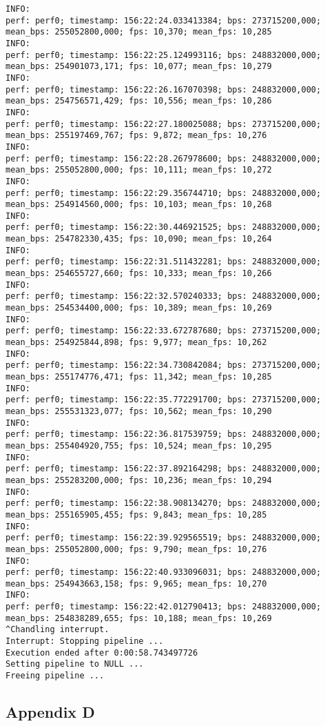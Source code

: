 \documentclass[12pt,oneside]{book}
\begin{document}
\begin{lstlisting}
INFO:
perf: perf0; timestamp: 156:22:24.033413384; bps: 273715200,000; mean_bps: 255052800,000; fps: 10,370; mean_fps: 10,285
INFO:
perf: perf0; timestamp: 156:22:25.124993116; bps: 248832000,000; mean_bps: 254901073,171; fps: 10,077; mean_fps: 10,279
INFO:
perf: perf0; timestamp: 156:22:26.167070398; bps: 248832000,000; mean_bps: 254756571,429; fps: 10,556; mean_fps: 10,286
INFO:
perf: perf0; timestamp: 156:22:27.180025088; bps: 273715200,000; mean_bps: 255197469,767; fps: 9,872; mean_fps: 10,276
INFO:
perf: perf0; timestamp: 156:22:28.267978600; bps: 248832000,000; mean_bps: 255052800,000; fps: 10,111; mean_fps: 10,272
INFO:
perf: perf0; timestamp: 156:22:29.356744710; bps: 248832000,000; mean_bps: 254914560,000; fps: 10,103; mean_fps: 10,268
INFO:
perf: perf0; timestamp: 156:22:30.446921525; bps: 248832000,000; mean_bps: 254782330,435; fps: 10,090; mean_fps: 10,264
INFO:
perf: perf0; timestamp: 156:22:31.511432281; bps: 248832000,000; mean_bps: 254655727,660; fps: 10,333; mean_fps: 10,266
INFO:
perf: perf0; timestamp: 156:22:32.570240333; bps: 248832000,000; mean_bps: 254534400,000; fps: 10,389; mean_fps: 10,269
INFO:
perf: perf0; timestamp: 156:22:33.672787680; bps: 273715200,000; mean_bps: 254925844,898; fps: 9,977; mean_fps: 10,262
INFO:
perf: perf0; timestamp: 156:22:34.730842084; bps: 273715200,000; mean_bps: 255174776,471; fps: 11,342; mean_fps: 10,285
INFO:
perf: perf0; timestamp: 156:22:35.772291700; bps: 273715200,000; mean_bps: 255531323,077; fps: 10,562; mean_fps: 10,290
INFO:
perf: perf0; timestamp: 156:22:36.817539759; bps: 248832000,000; mean_bps: 255404920,755; fps: 10,524; mean_fps: 10,295
INFO:
perf: perf0; timestamp: 156:22:37.892164298; bps: 248832000,000; mean_bps: 255283200,000; fps: 10,236; mean_fps: 10,294
INFO:
perf: perf0; timestamp: 156:22:38.908134270; bps: 248832000,000; mean_bps: 255165905,455; fps: 9,843; mean_fps: 10,285
INFO:
perf: perf0; timestamp: 156:22:39.929565519; bps: 248832000,000; mean_bps: 255052800,000; fps: 9,790; mean_fps: 10,276
INFO:
perf: perf0; timestamp: 156:22:40.933096031; bps: 248832000,000; mean_bps: 254943663,158; fps: 9,965; mean_fps: 10,270
INFO:
perf: perf0; timestamp: 156:22:42.012790413; bps: 248832000,000; mean_bps: 254838289,655; fps: 10,188; mean_fps: 10,269
^Chandling interrupt.
Interrupt: Stopping pipeline ...
Execution ended after 0:00:58.743497726
Setting pipeline to NULL ...
Freeing pipeline ...
\end{lstlisting}

\subsection*{Appendix D}
\end{document}
